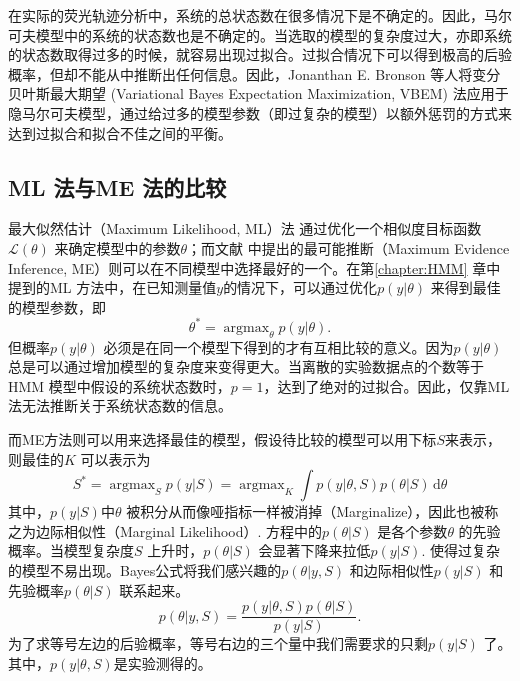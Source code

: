 \documentclass[11pt, a4paper]{article}
\DeclareMathOperator*{\argmax}{argmax}
\begin{document}
    在实际的荧光轨迹分析中，系统的总状态数在很多情况下是不确定的。因此，马尔可夫模型中的系统的状态数也是不确定的。当选取的模型的复杂度过大，亦即系统的状态数取得过多的时候，就容易出现过拟合。过拟合情况下可以得到极高的后验概率，但却不能从中推断出任何信息。因此，Jonanthan E. Bronson 等人将变分贝叶斯最大期望 (Variational Bayes Expectation Maximization, VBEM) 法应用于隐马尔可夫模型\cite{VBEM}，通过给过多的模型参数（即过复杂的模型）以额外惩罚的方式来达到过拟合和拟合不佳之间的平衡。

    \subsection{ML 法与ME 法的比较}
    最大似然估计（Maximum Likelihood, ML）法\cite{wiki:mle} 通过优化一个相似度目标函数$\mathcal L(\theta)$ 来确定模型中的参数$\theta$；而文献\cite{VBEM} 中提出的最可能推断（Maximum Evidence Inference, ME）则可以在不同模型中选择最好的一个。在第\ref{chapter:HMM} 章中提到的ML 方法中，在已知测量值$y$的情况下，可以通过优化$p(y|\theta)$ 来得到最佳的模型参数，即
    \begin{equation}\label{eqn:ML_estimate}
      \theta^* = \argmax_\theta p(y| \theta).
    \end{equation}
    但概率$p(y|\theta)$ 必须是在同一个模型下得到的才有互相比较的意义。因为$p(y|\theta)$ 总是可以通过增加模型的复杂度来变得更大。当离散的实验数据点的个数等于HMM 模型中假设的系统状态数时，$p=1$，达到了绝对的过拟合。因此，仅靠ML 法无法推断关于系统状态数的信息。

    而ME方法则可以用来选择最佳的模型，假设待比较的模型可以用下标$S$来表示，则最佳的$K$ 可以表示为
    \begin{equation}\label{eqn:ME_model}
      S^* = \argmax_S p(y| S) = \argmax_K \int p(y| \theta, S)p(\theta| S)\,\mathrm d\theta
    \end{equation}
    其中，$p(y| S)$中$\theta$ 被积分从而像哑指标一样被消掉（Marginalize），因此也被称之为边际相似性（Marginal Likelihood）. 方程中的$p(\theta | S)$ 是各个参数$\theta$ 的先验概率。当模型复杂度$S$ 上升时，$p(\theta | S)$ 会显著下降来拉低$p(y| S)$. 使得过复杂的模型不易出现。Bayes公式将我们感兴趣的$p(\theta|y,S)$ 和边际相似性$p(y|S)$ 和先验概率$p(\theta|S)$ 联系起来。
    \begin{equation}\label{eqn:bayes_vbem}
      p(\theta| y, S) = \frac{p(y| \theta, S)p(\theta| S)}{p(y| S)}.
    \end{equation}
    为了求等号左边的后验概率，等号右边的三个量中我们需要求的只剩$p(y| S)$ 了。其中，$p(y| \theta, S)$是实验测得的。
\end{document}
